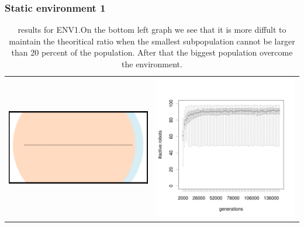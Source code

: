 \documentclass[a4paper,10pt]{article}
\begin{document}
\subsubsection{Static environment 1}
\begin{table}[H]
\caption{results for ENV1.\newline On the bottom left graph we see that it is more diffult to maintain the theoritical ratio when the smallest subpopulation cannot be larger than 20 percent of the population. After that the biggest population overcome the environment. }
\centering
\begin{tabular}{cc}
\includegraphics[width=\imgSize]{../images/5StaticEnv/environments/staticEnv1}&\includegraphics[width=\imgSize]{../images/5StaticEnv/alive_staticEnv1}\\

\end{tabular}
\end{table}
\end{document}
